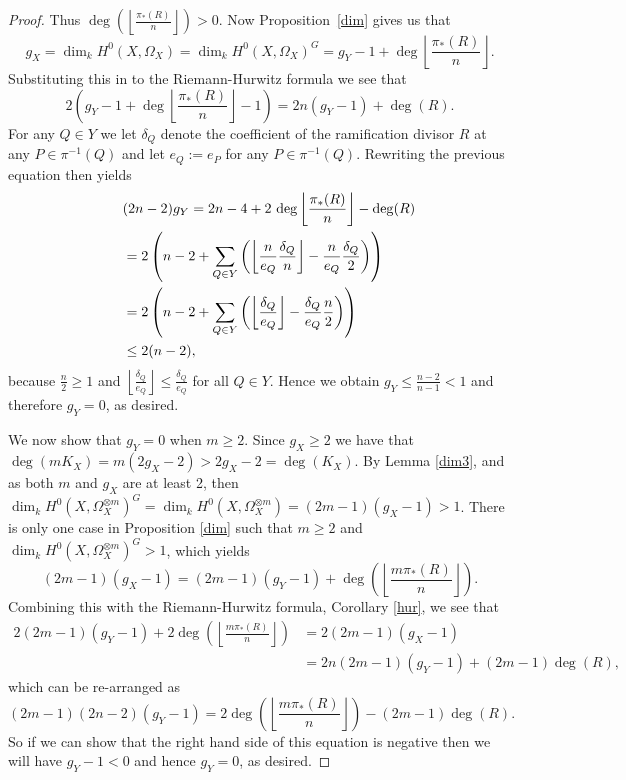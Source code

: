 \begin{proof}
    Thus $\deg\left( \left\lfloor \frac{\pi_*(R)}{n} \right\rfloor \right) >0$. 
    Now Proposition~\ref{dim} gives us that
        \begin{equation*}
        g_X=\dim_k H^0(X,\Omega_X)=\dim_k H^0(X,\Omega_X)^G= g_Y-1+\deg\left\lfloor \frac{\pi_*(R)}{n} \right\rfloor.
        \end{equation*}
    Substituting this in to the Riemann-Hurwitz formula we see that
        \begin{equation*}
        2\left(g_Y - 1 + \deg\left \lfloor \frac{\pi_*(R)}{n} \right \rfloor -1 \right) = 2n (g_Y -1) + \deg(R).
        \end{equation*}
    For any $Q \in Y$ we let $\delta_Q$ denote the coefficient of the ramification divisor $R$ at any $P \in \pi^{-1}(Q)$ and let $e_Q := e_P$ for any $P \in \pi^{-1}(Q)$. 
    Rewriting the previous equation then yields
        \begin{align*}
        \lefteqn{(2n-2)g_Y = 2n-4 + 2 \,\deg\left \lfloor \frac{\pi_*(R)}{n}\right \rfloor - \deg(R)}\\
        &= 2 \left(n-2 + \sum_{Q \in Y} \left(\left\lfloor \frac{n}{e_Q} \frac{\delta_Q}{n} \right\rfloor - \frac{n}{e_Q} \frac{\delta_Q}{2}\right) \right)\\
        &= 2 \left(n-2 + \sum_{Q \in Y} \left( \left\lfloor \frac{\delta_Q}{e_Q} \right\rfloor - \frac{\delta_Q}{e_Q} \frac{n}{2} \right)\right)\\
        & \le  2(n-2),
        \end{align*}
    because $\frac{n}{2} \ge 1$ and $\left\lfloor \frac{\delta_Q}{e_Q}\right\rfloor \le \frac{\delta_Q}{e_Q}$ for all $Q \in Y$. 
    Hence we obtain $g_Y \le \frac{n-2}{n-1} < 1$ and therefore $g_Y =0$, as desired.
    
    We now show that $g_Y=0$ when $m\geq 2$. 
    Since $g_X\geq 2$ we have that $\deg(mK_X)=m(2g_X-2)>2g_X-2=\deg(K_X)$.
    By Lemma \ref{dim3}, and as both $m$ and $g_X$ are at least 2, then $\dim_kH^0(X,\Omega_X^{\otimes m})^G=\dim_kH^0(X,\Omega_X^{\otimes m})=(2m-1)(g_X-1)>1$.
    There is only one case in Proposition \ref{dim} such that $m\geq 2$ and $\dim_k H^0(X,\Omega_X^{\otimes m})^G>1$, which yields 
        \begin{equation*}
        (2m-1)(g_X-1)=(2m-1)(g_Y-1)+\deg\left(\left\lfloor \frac{m\pi_*(R)}{n} \right\rfloor \right).
        \end{equation*}
    Combining this with the Riemann-Hurwitz formula, Corollary \ref{hur}, we see that
        \begin{align*}
        2(2m-1)(g_Y-1)+2\deg\left(\left\lfloor\frac{m\pi_*(R)}{n}\right\rfloor\right) & =  2(2m-1)(g_X-1)\\
        & =  2n(2m-1)(g_Y-1)+(2m-1)\deg(R),
        \end{align*}
    which can be re-arranged as
        \begin{equation*}
        (2m-1)(2n-2)(g_Y-1)=2\deg\left(\left\lfloor\frac{m\pi_*(R)}{n}\right\rfloor\right)-(2m-1)\deg(R).
        \end{equation*}
    So if we can show that the right hand side of this equation is negative then we will have $g_Y-1<0$ and hence $g_Y=0$, as desired.
    

\end{proof}
